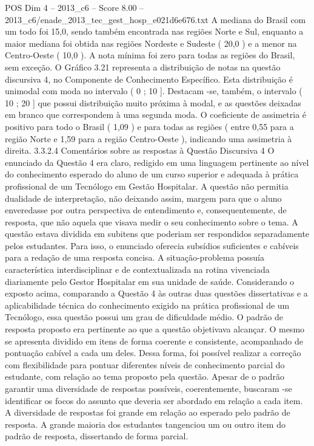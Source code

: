 \begin{textsample}{POS Dim 4 – 2013\_c6 – Score 8.00 – 2013\_c6/enade\_2013\_tec\_gest\_hosp\_e021d6e676.txt}
A mediana do Brasil com um todo foi 15,0, sendo também encontrada nas regiões Norte e Sul, enquanto a maior mediana foi obtida nas regiões Nordeste e Sudeste ( 20,0 ) e a menor na Centro-Oeste ( 10,0 ).
A nota mínima foi zero para todas as regiões do Brasil, sem exceção.
O Gráfico 3.21 representa a distribuição de notas na questão discursiva 4, no Componente de Conhecimento Específico.
Esta distribuição é unimodal com moda no intervalo ( 0 ; 10 ].
Destacam -se, também, o intervalo ( 10 ; 20 ] que possui distribuição muito próxima à modal, e as questões deixadas em branco que correspondem à uma segunda moda.
O coeficiente de assimetria é positivo para todo o Brasil ( 1,09 ) e para todas as regiões ( entre 0,55 para a região Norte e 1,59 para a região Centro-Oeste ), indicando uma assimetria à direita. 3.3.2.4 Comentários sobre as respostas à Questão Discursiva 4 O enunciado da Questão 4 era claro, redigido em uma linguagem pertinente ao nível do conhecimento esperado do aluno de um curso superior e adequada à prática profissional de um Tecnólogo em Gestão Hospitalar.
A questão não permitia dualidade de interpretação, não deixando assim, margem para que o aluno enveredasse por outra perspectiva de entendimento e, consequentemente, de resposta, que não aquela que visava medir o seu conhecimento sobre o tema.
A questão estava dividida em subitens que poderiam ser respondidos separadamente pelos estudantes.
Para isso, o enunciado oferecia subsídios suficientes e cabíveis para a redação de uma resposta concisa.
A situação-problema possuía característica interdisciplinar e de contextualizada na rotina vivenciada diariamente pelo Gestor Hospitalar em sua unidade de saúde.
Considerando o exposto acima, comparando a Questão 4 às outras duas questões dissertativas e a aplicabilidade técnica do conhecimento exigido na prática profissional de um Tecnólogo, essa questão possui um grau de dificuldade médio.
O padrão de resposta proposto era pertinente ao que a questão objetivava alcançar.
O mesmo se apresenta dividido em itens de forma coerente e consistente, acompanhado de pontuação cabível a cada um deles.
Dessa forma, foi possível realizar a correção com flexibilidade para pontuar diferentes níveis de conhecimento parcial do estudante, com relação ao tema proposto pela questão.
Apesar de o padrão garantir uma diversidade de respostas possíveis, coerentemente, buscaram -se identificar os focos do assunto que deveria ser abordado em relação a cada item.
A diversidade de respostas foi grande em relação ao esperado pelo padrão de resposta.
A grande maioria dos estudantes tangenciou um ou outro item do padrão de resposta, dissertando de forma parcial.

\end{textsample}
